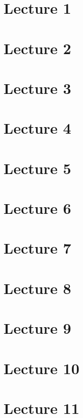 \documentclass[11pt]{article}
\begin{document}
\tableofcontents

\part{Lecture 1}

    

\part{Lecture 2}

    

\part{Lecture 3}

    

\part{Lecture 4}

    

\part{Lecture 5}

    

\part{Lecture 6}

    

\part{Lecture 7}

    

\part{Lecture 8}

    

\part{Lecture 9}

    

    \part{Lecture 10}

    

\part{Lecture 11}

    
\end{document}
